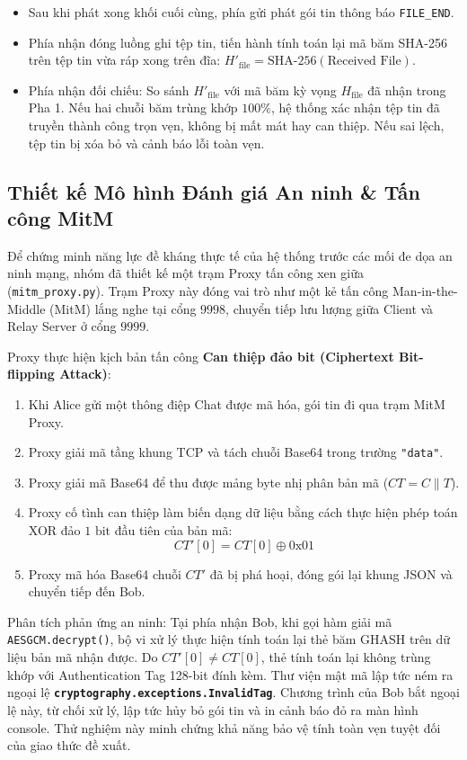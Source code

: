 \documentclass[a4paper,12pt]{article}
\begin{document}
\begin{itemize}
\begin{itemize}
        \item Sau khi phát xong khối cuối cùng, phía gửi phát gói tin thông báo \texttt{FILE\_END}.
        \item Phía nhận đóng luồng ghi tệp tin, tiến hành tính toán lại mã băm SHA-256 trên tệp tin vừa ráp xong trên đĩa: $H'_{\text{file}} = \text{SHA-256}(\text{Received File})$.
        \item Phía nhận đối chiếu: So sánh $H'_{\text{file}}$ với mã băm kỳ vọng $H_{\text{file}}$ đã nhận trong Pha 1. Nếu hai chuỗi băm trùng khớp $100\%$, hệ thống xác nhận tệp tin đã truyền thành công trọn vẹn, không bị mất mát hay can thiệp. Nếu sai lệch, tệp tin bị xóa bỏ và cảnh báo lỗi toàn vẹn.
    \end{itemize}
\end{itemize}

\subsection{Thiết kế Mô hình Đánh giá An ninh \& Tấn công MitM}
Để chứng minh năng lực đề kháng thực tế của hệ thống trước các mối đe dọa an ninh mạng, nhóm đã thiết kế một trạm Proxy tấn công xen giữa (\texttt{mitm\_proxy.py}). Trạm Proxy này đóng vai trò như một kẻ tấn công Man-in-the-Middle (MitM) lắng nghe tại cổng $9998$, chuyển tiếp lưu lượng giữa Client và Relay Server ở cổng $9999$.

Proxy thực hiện kịch bản tấn công \textbf{Can thiệp đảo bit (Ciphertext Bit-flipping Attack)}:
\begin{enumerate}
    \item Khi Alice gửi một thông điệp Chat được mã hóa, gói tin đi qua trạm MitM Proxy.
    \item Proxy giải mã tầng khung TCP và tách chuỗi Base64 trong trường \texttt{"data"}.
    \item Proxy giải mã Base64 để thu được mảng byte nhị phân bản mã ($CT = C \parallel T$).
    \item Proxy cố tình can thiệp làm biến dạng dữ liệu bằng cách thực hiện phép toán XOR đảo $1\text{ bit}$ đầu tiên của bản mã:
    \begin{equation}
        CT'[0] = CT[0] \oplus 0\text{x}01
    \end{equation}
    \item Proxy mã hóa Base64 chuỗi $CT'$ đã bị phá hoại, đóng gói lại khung JSON và chuyển tiếp đến Bob.
\end{enumerate}

Phân tích phản ứng an ninh: Tại phía nhận Bob, khi gọi hàm giải mã \texttt{AESGCM.decrypt()}, bộ vi xử lý thực hiện tính toán lại thẻ băm GHASH trên dữ liệu bản mã nhận được. Do $CT'[0] \neq CT[0]$, thẻ tính toán lại không trùng khớp với Authentication Tag 128-bit đính kèm. Thư viện mật mã lập tức ném ra ngoại lệ \textbf{\texttt{cryptography.exceptions.InvalidTag}}. Chương trình của Bob bắt ngoại lệ này, từ chối xử lý, lập tức hủy bỏ gói tin và in cảnh báo đỏ ra màn hình console. Thử nghiệm này minh chứng khả năng bảo vệ tính toàn vẹn tuyệt đối của giao thức đề xuất.
\end{document}
